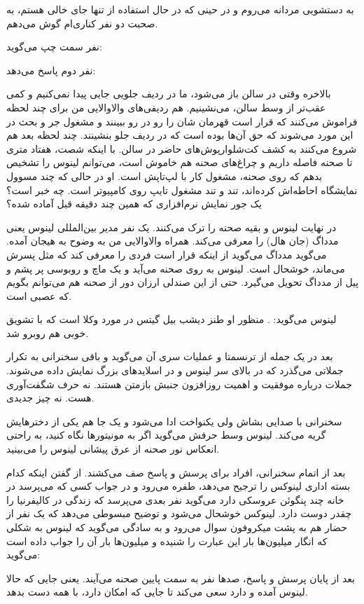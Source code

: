 \begin{journal}
به دستشویی مردانه می‌روم و در حینی که در حال استفاده از تنها جای خالی
هستم، به صحبت‌ دو نفر کناری‌ام گوش می‌دهم.

نفر سمت چپ می‌گوید: 

نفر دوم پاسخ می‌دهد: 

بالاخره وقتی در سالن باز می‌شود، ما در ردیف جلویی جایی پیدا نمی‌کنیم و
کمی عقب‌تر از وسط سالن، می‌نشینیم. هم ردیفی‌های والاوالایی من برای چند
لحظه فراموش می‌کنند که قرار است قهرمان شان را رو در رو ببینند و مشغول
جر و بحث در این مورد می‌شوند که حق آن‌ها بوده‌ است که در ردیف جلو
بنشینند. چند لحظه بعد هم شروع می‌کنند به کشف کت‌شلوارپوش‌های حاضر در
سالن. با اینکه شصت، هفتاد متری تا صحنه فاصله داریم و چراغ‌های صحنه هم
خاموش است، می‌توانم لینوس را تشخیص بدهم که روی صحنه، مشغول کار با
لپ‌تاپش است. او در حالی که چند مسوول نمایشگاه احاطه‌اش کرده‌اند، تند و
تند مشغول تایپ روی کامپیوتر است. چه خبر است؟ یک جور نمایش نرم‌افزاری که
همین چند دقیقه قبل آماده شده؟‌

در نهایت لینوس و بقیه صحنه را ترک می‌کنند. یک نفر مدیر بین‌المللی لینوس
یعنی مدداگ (جان هال) را معرفی می‌کند. همراه والاوالایی من به وضوح به
هیجان آمده. می‌گوید  مدداگ می‌گوید از اینکه
قرار است فردی را معرفی کند که مثل پسرش می‌ماند، خوشحال است. لینوس به
روی صحنه می‌آید و یک ماچ و روبوسی پر پشم و پیل از مدداگ تحویل
می‌گیرد. حتی از این صندلی ارزان دور از صحنه هم می‌توانم بگویم که عصبی
است.

لینوس می‌گوید: . منظور او طنز دیشب بیل
گیتس در مورد وکلا است که با تشویق خوبی هم روبرو شد.

بعد در یک جمله از ترنسمتا و عملیات سری آن می‌گوید و باقی سخنرانی به
تکرار جملاتی می‌گذرد که در بالای سر لینوس و در اسلایدهای بزرگ نمایش
داده می‌شوند. جملات درباره موفقیت و اهمیت روزافزون جنبش بازمتن
هستند. نه حرف شگفت‌آوری هست. نه چیز جدیدی.

سخنرانی با صدایی بشاش ولی یکنواخت ادا می‌شود و یک جا هم یکی از دخترهایش
گریه می‌کند. لینوس وسط حرفش می‌گوید  اگر به
مونیتورها نگاه کنید، به راحتی انعکاس نور صحنه از عرق پیشانی لینوس را
می‌بینید.

بعد از اتمام سخنرانی، افراد برای پرسش و پاسخ صف می‌کشند. از گفتن اینکه
کدام بسته اداری لینوکس را ترجیح می‌دهد، طفره می‌رود و در جواب کسی که
می‌پرسد در خانه چند پنگوئن عروسکی دارد می‌گوید  نفر
بعدی می‌پرسد که زندگی در کالیفرنیا را چقدر دوست دارد. لینوکس خوشحال
می‌شود و توضیح مبسوطی می‌دهد که  یک نفر از حضار هم به پشت میکروفون سوال می‌رود
و به سادگی می‌گوید که  لینوس به شکلی که
انگار میلیون‌ها بار این عبارت را شنیده و میلیون‌ها بار آن را جواب داده
است می‌گوید: 

بعد از پایان پرسش و پاسخ، صدها نفر به سمت پایین صحنه می‌آیند. یعنی جایی
که حالا لینوس آمده و دارد سعی می‌کند تا جایی که امکان دارد، با همه دست
بدهد.
\end{journal}

